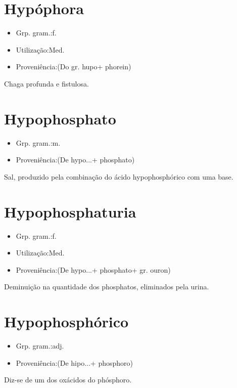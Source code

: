 \documentclass{article}
\begin{document}
\section{Hypóphora}
\begin{itemize}
\item {Grp. gram.:f.}
\end{itemize}
\begin{itemize}
\item {Utilização:Med.}
\end{itemize}
\begin{itemize}
\item {Proveniência:(Do gr. \textunderscore hupo\textunderscore  + \textunderscore phorein\textunderscore )}
\end{itemize}
Chaga profunda e fistulosa.
\section{Hypophosphato}
\begin{itemize}
\item {Grp. gram.:m.}
\end{itemize}
\begin{itemize}
\item {Proveniência:(De \textunderscore hypo...\textunderscore  + \textunderscore phosphato\textunderscore )}
\end{itemize}
Sal, produzido pela combinação do ácido hypophosphórico com uma base.
\section{Hypophosphaturia}
\begin{itemize}
\item {Grp. gram.:f.}
\end{itemize}
\begin{itemize}
\item {Utilização:Med.}
\end{itemize}
\begin{itemize}
\item {Proveniência:(De \textunderscore hypo...\textunderscore  + \textunderscore phosphato\textunderscore  + gr. \textunderscore ouron\textunderscore )}
\end{itemize}
Deminuição na quantidade dos phosphatos, eliminados pela urina.
\section{Hypophosphórico}
\begin{itemize}
\item {Grp. gram.:adj.}
\end{itemize}
\begin{itemize}
\item {Proveniência:(De \textunderscore hipo...\textunderscore  + \textunderscore phosphoro\textunderscore )}
\end{itemize}
Diz-se de um dos oxácidos do phósphoro.
\end{document}
